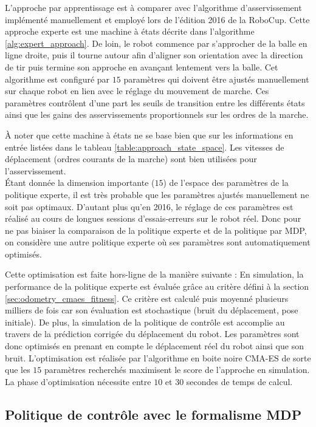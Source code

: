 L'approche par apprentissage est à comparer avec l'algorithme d'asservissement
implémenté manuellement et employé lors de l'édition 2016 de la RoboCup.
Cette approche experte est une machine à états 
décrite dans l'algorithme \ref{alg:expert_approach}.
De loin, le robot commence par s'approcher de la balle en ligne droite,
puis il tourne autour afin d'aligner son orientation avec la direction de tir
puis termine son approche en avançant lentement vers la balle.
Cet algorithme est configuré par $15$ paramètres
qui doivent être ajustés manuellement sur chaque robot en lien 
avec le réglage du mouvement de marche.
Ces paramètres contrôlent d'une part les seuils de transition
entre les différents états ainsi que les gains des asservissements 
proportionnels sur les ordres de la marche.

À noter que cette machine à états ne se base bien que sur les
informations en entrée listées dans le tableau \ref{table:approach_state_space}.
Les vitesses de déplacement (ordres courants de la marche) sont bien
utilisées pour l'asservissement.\\

Étant donnée la dimension importante ($15$) de l'espace des paramètres 
de la politique experte, il est très probable que les paramètres
ajustés manuellement ne soit pas optimaux.
D'autant plus qu'en 2016, le réglage de ces paramètres est réalisé
au cours de longues sessions d'essais-erreurs sur le robot réel.
Donc pour ne pas biaiser la comparaison de la politique experte et
de la politique par MDP, on considère une autre politique experte 
où ses paramètres sont automatiquement optimisés.

Cette optimisation est faite hors-ligne de la manière suivante :
En simulation, la performance de la politique experte est évaluée
grâce au critère défini à la section \ref{sec:odometry_cmaes_fitness}. 
Ce critère est calculé puis moyenné plusieurs milliers de fois 
car son évaluation est stochastique (bruit du déplacement, pose initiale).
De plus, la simulation de la politique de contrôle est accomplie au travers 
de la prédiction corrigée du déplacement du robot.
Les paramètres sont donc optimisés en prenant en compte le déplacement
réel du robot ainsi que son bruit.
L'optimisation est réalisée par l'algorithme en boite noire CMA-ES de sorte
que les $15$ paramètres recherchés maximisent le score de l'approche en simulation.
La phase d'optimisation nécessite entre $10$ et $30$ secondes de temps de calcul.

\subsection{Politique de contrôle avec le formalisme MDP}

